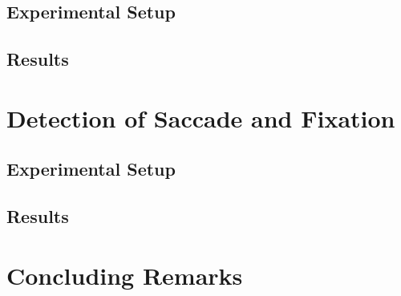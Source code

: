 \documentclass[preprint,12pt]{elsarticle}
\begin{document}
\subsection{Experimental Setup}

\subsection{Results}

\section{Detection of Saccade and Fixation}
\label{sec:detection_of_saccade_and_fixation}

\subsection{Experimental Setup}

\subsection{Results}

\section{Concluding Remarks}



\end{document}
